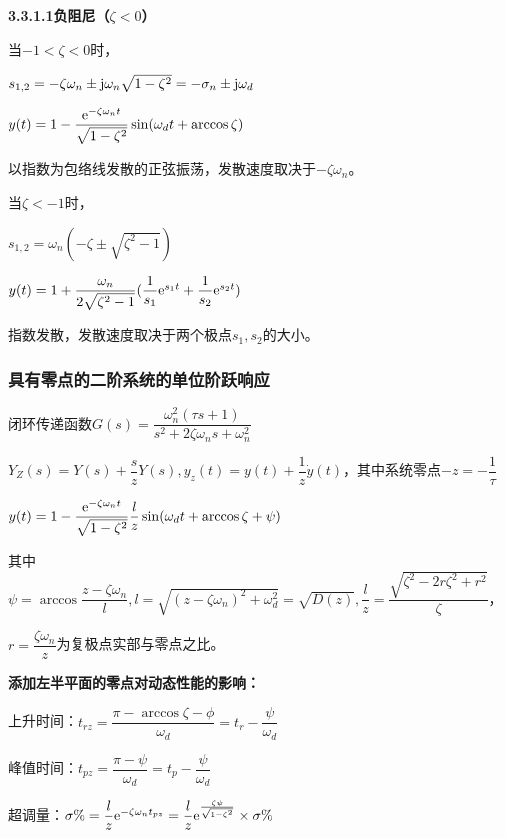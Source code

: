 \documentclass[11pt,a4paper]{ctexart}
\begin{document}
            {\setlength{\parindent}{0pt}\textbf{3.3.1.1\quad 负阻尼（$\zeta<0$）}}
                
                当$-1<\zeta<0$时，

                $s_{1,2}=-\zeta\omega_n\pm{\rm j}\omega_n\sqrt{1-\zeta^2}=-\sigma_n\pm{\rm j}\omega_d$

                $y(t)=1-\dfrac{{\rm e}^{-\zeta\omega_nt}}{\sqrt{1-\zeta^2}}\sin(\omega_dt+\arccos\zeta)$

                以指数为包络线发散的正弦振荡，发散速度取决于$-\zeta\omega_n$。

                当$\zeta<-1$时，

                $s_{1,2}=\omega_n(-\zeta\pm\sqrt{\zeta^2-1})$

                $y(t)=1+\dfrac{\omega_n}{2\sqrt{\zeta^2-1}}(\dfrac{1}{s_1}{\rm e}^{s_1t}+\dfrac{1}{s_2}{\rm e}^{s_2t})$

                指数发散，发散速度取决于两个极点$s_1,s_2$的大小。
        \subsubsection{具有零点的二阶系统的单位阶跃响应}
            闭环传递函数$G(s)=\dfrac{\omega_n^2(\tau s+1)}{s^2+2\zeta\omega_ns+\omega_n^2}$
    
            $Y_Z(s)=Y(s)+\dfrac szY(s),y_z(t)=y(t)+\dfrac 1z\dot{y}(t)$，其中系统零点$-z=-\dfrac 1\tau$
        
            $y(t)=1-\dfrac{{\rm e}^{-\zeta\omega_nt}}{\sqrt{1-\zeta^2}}\dfrac lz\sin(\omega_dt+\arccos\zeta+\psi)$
            
            其中$\psi=\arccos\dfrac{z-\zeta\omega_n}{l},l=\sqrt{(z-\zeta\omega_n)^2+\omega_d^2}=\sqrt{D(z)},\dfrac lz=\dfrac{\sqrt{\zeta^2-2r\zeta^2+r^2}}{\zeta}$，
            
            $r=\dfrac{\zeta\omega_n}{z}$为复极点实部与零点之比。
            
            {\setlength{\parindent}{0pt}\textbf{添加左半平面的零点对动态性能的影响：}}
            
            上升时间：$t_{rz}=\dfrac{\pi-\arccos\zeta-\phi}{\omega_d}=t_r-\dfrac{\psi}{\omega_d}$

            峰值时间：$t_{pz}=\dfrac{\pi-\psi}{\omega_d}=t_p-\dfrac{\psi}{\omega_d}$

            超调量：$\sigma\%=\dfrac lz{\rm e}^{-\zeta\omega_nt_{pz}}=\dfrac lz{\rm e}^{\frac{\zeta\psi}{\sqrt{1-\zeta^2}}}\times\sigma\%$
\end{document}
